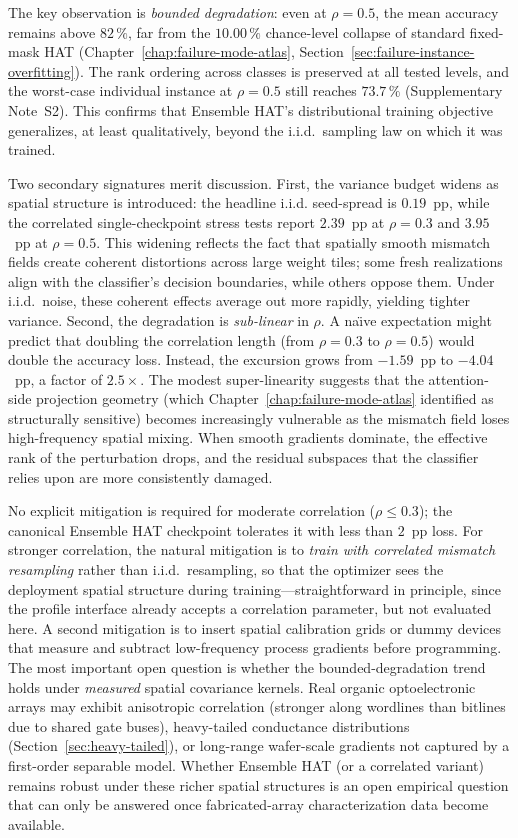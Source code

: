 The key observation is \emph{bounded degradation}: even at $\rho=0.5$, the mean accuracy remains above $82\,\%$, far from the $10.00\,\%$ chance-level collapse of standard fixed-mask HAT (Chapter~\ref{chap:failure-mode-atlas}, Section~\ref{sec:failure-instance-overfitting}).  The rank ordering across classes is preserved at all tested levels, and the worst-case individual instance at $\rho=0.5$ still reaches $73.7\,\%$ (Supplementary Note~S2).  This confirms that Ensemble HAT's distributional training objective generalizes, at least qualitatively, beyond the i.i.d.~sampling law on which it was trained.

Two secondary signatures merit discussion.  First, the variance budget widens as spatial structure is introduced: the headline i.i.d. seed-spread is $0.19$~pp, while the correlated single-checkpoint stress tests report $2.39$~pp at $\rho=0.3$ and $3.95$~pp at $\rho=0.5$.  This widening reflects the fact that spatially smooth mismatch fields create coherent distortions across large weight tiles; some fresh realizations align with the classifier's decision boundaries, while others oppose them.  Under i.i.d.~noise, these coherent effects average out more rapidly, yielding tighter variance.  Second, the degradation is \emph{sub-linear} in $\rho$.  A na\"{\i}ve expectation might predict that doubling the correlation length (from $\rho=0.3$ to $\rho=0.5$) would double the accuracy loss.  Instead, the excursion grows from $-1.59$~pp to $-4.04$~pp, a factor of $2.5\times$.  The modest super-linearity suggests that the attention-side projection geometry (which Chapter~\ref{chap:failure-mode-atlas} identified as structurally sensitive) becomes increasingly vulnerable as the mismatch field loses high-frequency spatial mixing.  When smooth gradients dominate, the effective rank of the perturbation drops, and the residual subspaces that the classifier relies upon are more consistently damaged.

No explicit mitigation is required for moderate correlation ($\rho \le 0.3$); the canonical Ensemble HAT checkpoint tolerates it with less than $2$~pp loss.  For stronger correlation, the natural mitigation is to \emph{train with correlated mismatch resampling} rather than i.i.d.~resampling, so that the optimizer sees the deployment spatial structure during training---straightforward in principle, since the profile interface already accepts a correlation parameter, but not evaluated here.  A second mitigation is to insert spatial calibration grids or dummy devices that measure and subtract low-frequency process gradients before programming.  The most important open question is whether the bounded-degradation trend holds under \emph{measured} spatial covariance kernels.  Real organic optoelectronic arrays may exhibit anisotropic correlation (stronger along wordlines than bitlines due to shared gate buses), heavy-tailed conductance distributions (Section~\ref{sec:heavy-tailed}), or long-range wafer-scale gradients not captured by a first-order separable model.  Whether Ensemble HAT (or a correlated variant) remains robust under these richer spatial structures is an open empirical question that can only be answered once fabricated-array characterization data become available.


